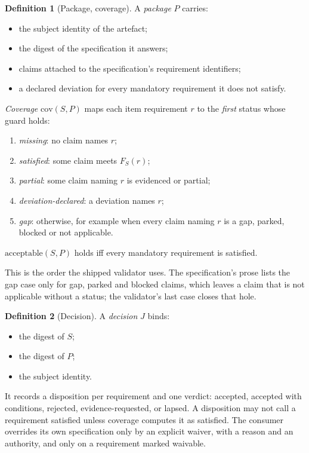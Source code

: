 \documentclass[11pt]{article}
\theoremstyle{definition}
\newtheorem{definition}{Definition}
\theoremstyle{remark}
\newcommand{\cov}{\mathrm{cov}}
\newcommand{\Acc}{\mathrm{acceptable}}
\begin{document}
\begin{definition}[Package, coverage]
A \emph{package} $P$ carries:
\begin{itemize}[itemsep=1pt]
\item the subject identity of the artefact;
\item the digest of the specification it answers;
\item claims attached to the specification's requirement identifiers;
\item a declared deviation for every mandatory requirement it does not satisfy.
\end{itemize}
\emph{Coverage} $\cov(S,P)$ maps each item requirement $r$ to the \emph{first} status whose guard
holds:
\begin{enumerate}[itemsep=1pt]
\item \emph{missing}: no claim names $r$;
\item \emph{satisfied}: some claim meets $F_S(r)$;
\item \emph{partial}: some claim naming $r$ is evidenced or partial;
\item \emph{deviation-declared}: a deviation names $r$;
\item \emph{gap}: otherwise, for example when every claim naming $r$ is a gap, parked, blocked or
  not applicable.
\end{enumerate}
$\Acc(S,P)$ holds iff every mandatory requirement is satisfied.
\end{definition}
\noindent This is the order the shipped validator uses. The specification's prose lists the gap
case only for gap, parked and blocked claims, which leaves a claim that is not applicable without a
status; the validator's last case closes that hole.

\begin{definition}[Decision]
A \emph{decision} $J$ binds:
\begin{itemize}[itemsep=1pt]
\item the digest of $S$;
\item the digest of $P$;
\item the subject identity.
\end{itemize}
It records a disposition per requirement and one verdict: accepted, accepted with conditions,
rejected, evidence-requested, or lapsed. A disposition may not call a requirement satisfied unless
coverage computes it as satisfied. The consumer overrides its own specification only by an
explicit waiver, with a reason and an authority, and only on a requirement marked waivable.
\end{definition}
\end{document}
